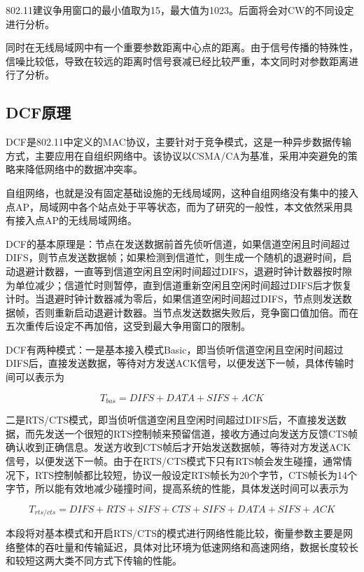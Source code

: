 \documentclass{article}
\begin{document}
802.11建议争用窗口的最小值取为15，最大值为1023。后面将会对CW的不同设定进行分析。

同时在无线局域网中有一个重要参数距离中心点的距离。由于信号传播的特殊性，信噪比较低，导致在较远的距离时信号衰减已经比较严重，本文同时对参数距离进行了分析。

\subsection{DCF原理}
DCF是802.11中定义的MAC协议，主要针对于竞争模式，这是一种异步数据传输方式，主要应用在自组织网络中。该协议以CSMA/CA为基准，采用冲突避免的策略来降低网络中的数据冲突率。

自组网络，也就是没有固定基础设施的无线局域网，这种自组网络没有集中的接入点AP，局域网中各个站点处于平等状态，而为了研究的一般性，本文依然采用具有接入点AP的无线局域网络。

DCF的基本原理是：节点在发送数据前首先侦听信道，如果信道空闲且时间超过DIFS，则节点发送数据帧；如果检测到信道忙，则生成一个随机的退避时间，启动退避计数器，一直等到信道空闲且空闲时间超过DIFS，退避时钟计数器按时隙为单位减少；信道忙时则暂停，直到信道重新空闲且空闲时间超过DIFS后才恢复计时。当退避时钟计数器减为零后，如果信道空闲时间超过DIFS，节点则发送数据帧，否则重新启动退避计数器。当节点发送数据失败后，竞争窗口值加倍。而在五次重传后设定不再加倍，这受到最大争用窗口的限制。

DCF有两种模式：一是基本接入模式Basic，即当侦听信道空闲且空闲时间超过DIFS后，直接发送数据，等待对方发送ACK信号，以便发送下一帧，具体传输时间可以表示为

\begin{equation}
T_{bas} = DIFS + DATA + SIFS + ACK
\end{equation}

二是RTS/CTS模式，即当侦听信道空闲且空闲时间超过DIFS后，不直接发送数据，而先发送一个很短的RTS控制帧来预留信道，接收方通过向发送方反馈CTS帧确认收到正确信息。发送方收到CTS帧后才开始发送数据帧，等待对方发送ACK信号，以便发送下一帧。由于在RTS/CTS模式下只有RTS帧会发生碰撞，通常情况下，RTS控制帧都比较短，协议一般设定RTS帧长为20个字节，CTS帧长为14个字节，所以能有效地减少碰撞时间，提高系统的性能，具体发送时间可以表示为

\begin{equation}
T_{rts/cts} = DIFS + RTS + SIFS + CTS + SIFS + DATA + SIFS + ACK
\end{equation}

本段将对基本模式和开启RTS/CTS的模式进行网络性能比较，衡量参数主要是网络整体的吞吐量和传输延迟，具体对比环境为低速网络和高速网络，数据长度较长和较短这两大类不同方式下传输的性能。
\end{document}
